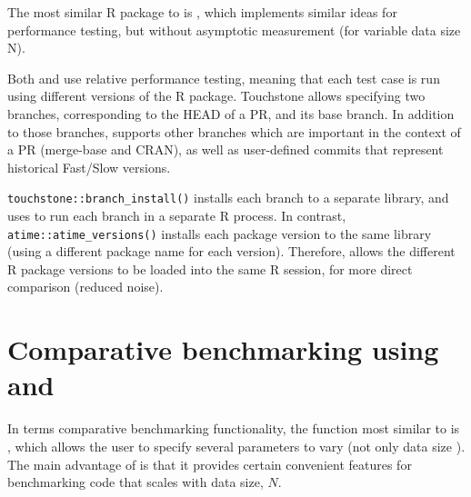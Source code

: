 The most similar R package to  is , which implements similar ideas for performance testing, but without asymptotic measurement (for variable data size N). 


Both  and  use relative performance testing, meaning that each test case is run using different versions of the R package.
Touchstone allows specifying two branches, corresponding to the HEAD of a PR, and its base branch.
In addition to those branches,  supports other branches which are important in the context of a PR (merge-base and CRAN), as well as user-defined commits that represent historical Fast/Slow versions.

\verb|touchstone::branch_install()| installs each branch to a separate library, and uses  to run each branch in a separate R process.
In contrast, \verb|atime::atime_versions()| installs each package version to the same library (using a different package name for each version).
Therefore,  allows the different R package versions to be loaded into the same R session, for more direct comparison (reduced noise).

\section{Comparative benchmarking using  and }


In terms comparative benchmarking functionality, the function most similar to  is , which allows the user to specify several parameters to vary (not only data size ).
The main advantage of  is that it provides certain convenient features for benchmarking code that scales with data size, $N$. 

